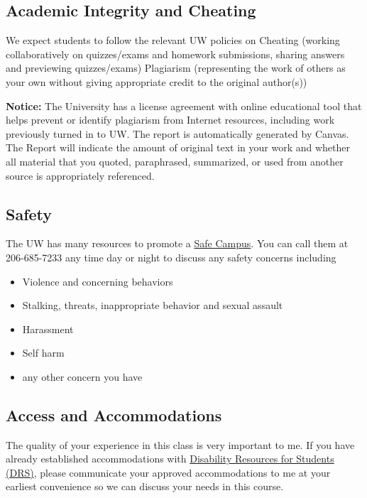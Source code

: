 \documentclass{article}	%
\begin{document}
    
\subsection{Academic Integrity and Cheating}
We expect students to follow the relevant UW policies on 
Cheating (working collaboratively on quizzes/exams and homework submissions, sharing answers and previewing quizzes/exams)
Plagiarism (representing the work of others as your own without giving appropriate credit to the original author(s)) 

{\bf 
    Notice:} The University has a license agreement with online educational tool 
that helps prevent or identify plagiarism from Internet resources, including 
work previously turned in to UW. The report is automatically generated by 
Canvas. The Report will indicate the amount of original text in your work and 
whether all material that you quoted, paraphrased, summarized, or used from 
another source is appropriately referenced.

\subsection{Safety} 


The UW has many resources to promote a \href{https://www.washington.edu/safecampus/}
{Safe Campus}.  You can call them at 206-685-7233 any time day or night
to discuss any safety concerns including 
\begin{itemize}
    \item Violence and concerning behaviors
    \item Stalking, threats, inappropriate behavior and sexual assault
    \item Harassment
    \item Self harm
    \item any other concern you have
\end{itemize}

 
    
\subsection{ Access and Accommodations}
 
The quality of your experience in this class is very important to me. If you have already established accommodations with
\href{http://depts.washington.edu/uwdrs/}
{Disability Resources for Students (DRS)}, 
please communicate your approved accommodations to me at your earliest convenience so we can discuss your needs in this course.
\end{document}
